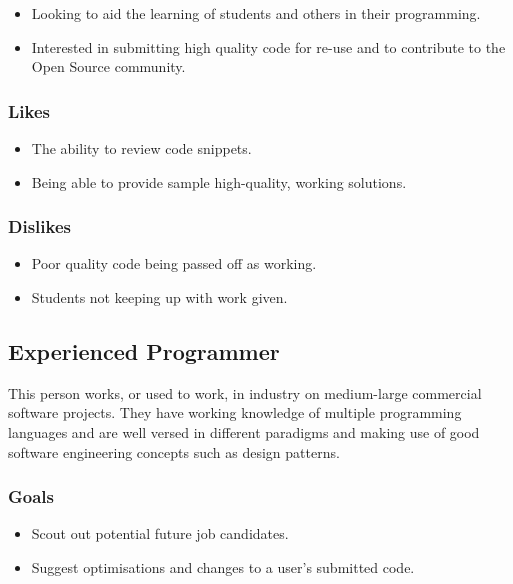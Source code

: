 \documentclass[11pt,a4paper]{article}
\begin{document}
\begin{itemize}
\item Looking to aid the learning of students and others in their programming.
\item Interested in submitting high quality code for re-use and to contribute
to the Open Source community.
\end{itemize}

\subsubsection{Likes}

\begin{itemize}
\item The ability to review code snippets.
\item Being able to provide sample high-quality, working solutions.
\end{itemize}

\subsubsection{Dislikes}

\begin{itemize}
\item Poor quality code being passed off as working.
\item Students not keeping up with work given.
\end{itemize}

\newpage

\subsection{Experienced Programmer}

This person works, or used to work, in industry on medium-large commercial
software projects. They have working knowledge of multiple programming
languages and are well versed in different paradigms and making use of good
software engineering concepts such as design patterns.

\subsubsection{Goals}

\begin{itemize}
\item Scout out potential future job candidates.
\item Suggest optimisations and changes to a user's submitted code.
\end{itemize}
\end{document}
